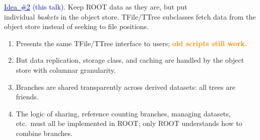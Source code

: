 \documentclass[aspectratio=169]{beamer}
\begin{document}
\begin{frame}{}
\vspace{1 cm}
\begin{center}
\Large \textcolor{darkblue}{\underline{Idea~\#2} (this talk).} Keep ROOT data as they are, but put \\ individual {\it baskets} in the object store. TFile/TTree subclasses fetch data from the object store instead of seeking to file positions.
\end{center}

\begin{enumerate}
\item<2-> Presents the same TFile/TTree interface to users; \textcolor{darkorange}{\bf old scripts still work.}
\item<3-> But data replication, storage class, and caching are handled by the object store with columnar granularity.
\item<4-> Branches are shared transparently across derived datasets: all trees are friends.
\item<5-> The logic of sharing, reference counting branches, managing datasets, etc.\ must all be implemented in ROOT; only ROOT understands how to combine branches.
\end{enumerate}

\begin{center}
\end{center}
\end{frame}
\end{document}
